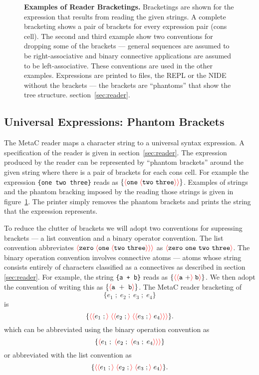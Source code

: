 \documentclass{article}
\newcommand{\mtt}[1]{\mbox{\tt #1}}
\newcommand{\fopen}{{\color{red} \langle}}
\newcommand{\fclose}{{\color{red} \rangle}}
\begin{document}
\begin{figure}
\caption{{\bf Examples of Reader Bracketings.} Bracketings are shown for the expression that results from reading the given strings.
  A complete bracketing shows a pair of brackets for every expression
  pair (cons cell).  The second and third example show two conventions
  for dropping some of the brackets --- general sequences are assumed
  to be right-associative and binary connective applications are
  assumed to be left-associative.  These conventions are used in the
  other examples.  Expressions are printed to files, the REPL or the NIDE without the brackets ---
  the brackets are ``phantoms'' that show the tree structure.
  section~\ref{sec:reader}.}
\label{fig:reader}
\end{figure}

\subsection{Universal Expressions: Phantom Brackets}

The MetaC reader maps a character string to a universal syntax expression.  A specification of the reader is given in section~\ref{sec:reader}.
The expression produced by the reader
can be represented by ``phantom brackets'' around the given string
where there is a pair of brackets for each cons cell.
For example the expression \mtt{\{one two three\}} reads as $\{\fopen \mathtt{one}\;\fopen \mathtt{two~three}\fclose \fclose\}$.
Examples of strings and the phantom bracking imposed by the reading those strings is given in figure~{\ref{fig:reader}}.
The printer simply removes the phantom brackets and prints the string that the expression represents.

To reduce the clutter of brackets we will adopt two conventions for supressing brackets --- a list convention and a binary operator convention.
The list convention abbreviates $\fopen \mathtt{zero}\;\fopen \mathtt{one}\;\fopen \mathtt{two~three}\fclose \fclose \fclose$
as $\fopen\mathtt{zero~one~two~three}\fclose$.  The binary operation convention involves connective atoms --- atoms whose string consists entirely of
characters classified as a connectives as described in section \ref{sec:reader}.  For example, the string \mtt{\{a + b\}} reads as
$\{\fopen \fopen \mathtt{a~+} \fclose \;\mathtt{b} \fclose \}$.  We then adopt the convention of writing this as
$\{\fopen \mathtt{a~+~b} \fclose \}$.
The MetaC reader bracketing of
$$\{e_1\;;\;e_2\;;\;e_3\;;\;e_4\}$$
is $$\{\fopen \fopen e_1\;;\fclose \;\fopen \fopen e_2\;;\fclose \;\fopen \fopen e_3\;;\fclose\;e_4\fclose\fclose\fclose\}.$$
which can be abbreviated using the binary operation convention as
$$\{\fopen e_1\;;\;\fopen e_2\;;\;\fopen e_3\;;\;e_4\fclose\fclose\fclose\}$$
or abbreviated with the list convention as
$$\{\fopen \fopen e_1\;;\fclose \;\fopen e_2\;;\fclose \;\fopen e_3\;;\fclose\;e_4\fclose\}.$$
\end{document}

